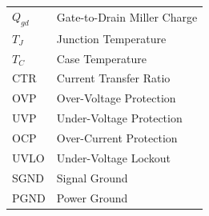 \begin{longtable}{p{3cm}p{11cm}}
$Q_{gd}$ & Gate-to-Drain Miller Charge \\
$T_J$ & Junction Temperature \\
$T_C$ & Case Temperature \\
CTR & Current Transfer Ratio \\
OVP & Over-Voltage Protection \\
UVP & Under-Voltage Protection \\
OCP & Over-Current Protection \\
UVLO & Under-Voltage Lockout \\
SGND & Signal Ground \\
PGND & Power Ground \\
\end{longtable}
